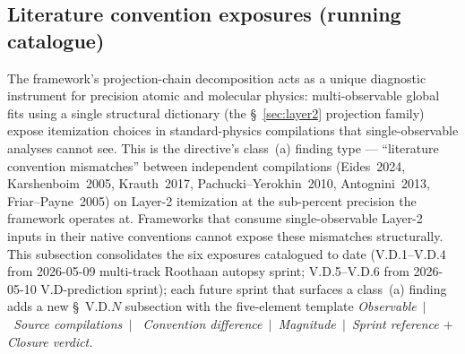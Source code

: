 \documentclass[11pt]{article}
\begin{document}
\subsection{Literature convention exposures (running catalogue)}
\label{sec:convention_exposures}

The framework's projection-chain decomposition acts as a unique
diagnostic instrument for precision atomic and molecular physics:
multi-observable global fits using a single structural dictionary
(the \S~\ref{sec:layer2} projection family) expose itemization
choices in standard-physics compilations that single-observable
analyses cannot see.  This is the directive's class~(a) finding
type --- ``literature convention mismatches'' between independent
compilations (Eides~2024, Karshenboim~2005, Krauth~2017,
Pachucki--Yerokhin~2010, Antognini~2013, Friar--Payne~2005)
on Layer-2 itemization at the sub-percent precision the framework
operates at.  Frameworks that consume single-observable Layer-2
inputs in their native conventions cannot expose these mismatches
structurally.  This subsection consolidates the six exposures
catalogued to date (V.D.1--V.D.4 from 2026-05-09 multi-track Roothaan
autopsy sprint; V.D.5--V.D.6 from 2026-05-10 V.D-prediction sprint);
each future sprint that surfaces a
class~(a) finding adds a new \S~V.D.$N$ subsection with the
five-element template \emph{Observable~$|$~Source compilations~$|$~
Convention difference~$|$~Magnitude~$|$~Sprint reference $+$ Closure verdict.}
\end{document}
